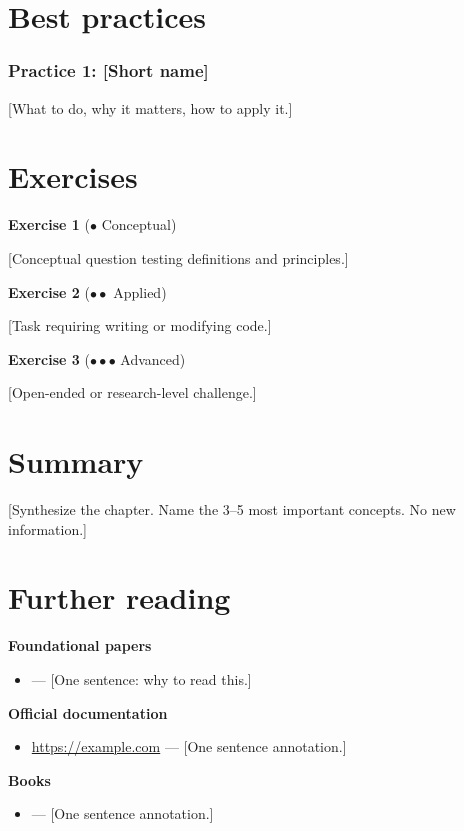 \section{Best practices}
\label{sec:chapter-label-practices}

\subsubsection{Practice 1: [Short name]}
[What to do, why it matters, how to apply it.]

\section{Exercises}
\label{sec:chapter-label-exercises}

\textbf{Exercise 1} (\(\bullet\) Conceptual)

[Conceptual question testing definitions and principles.]

\textbf{Exercise 2} (\(\bullet\bullet\) Applied)

[Task requiring writing or modifying code.]

\textbf{Exercise 3} (\(\bullet\bullet\bullet\) Advanced)

[Open-ended or research-level challenge.]

\section{Summary}
\label{sec:chapter-label-summary}

[Synthesize the chapter. Name the 3–5 most important concepts. No new information.]

\section{Further reading}
\label{sec:chapter-label-further}

\textbf{Foundational papers}
\begin{itemize}
  \item {} — [One sentence: why to read this.]
\end{itemize}

\textbf{Official documentation}
\begin{itemize}
  \item [Official source name.] \url{https://example.com} — [One sentence annotation.]
\end{itemize}

\textbf{Books}
\begin{itemize}
  \item {} — [One sentence annotation.]
\end{itemize}
